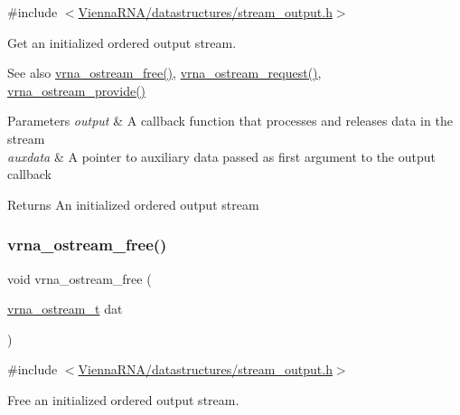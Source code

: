 {\ttfamily \#include $<$\hyperlink{datastructures_2stream__output_8h}{Vienna\+R\+N\+A/datastructures/stream\+\_\+output.\+h}$>$}



Get an initialized ordered output stream. 

\begin{DoxySeeAlso}{See also}
\hyperlink{group__buffer__utils_gaf813ec90e1446ba82c89f9a39688a3b3}{vrna\+\_\+ostream\+\_\+free()}, \hyperlink{group__buffer__utils_gaebca91932705d71bcbf00bd8d82bd7c8}{vrna\+\_\+ostream\+\_\+request()}, \hyperlink{group__buffer__utils_ga6253c42abdeaf3b41a38204865e1f0f7}{vrna\+\_\+ostream\+\_\+provide()}
\end{DoxySeeAlso}

\begin{DoxyParams}{Parameters}
{\em output} & A callback function that processes and releases data in the stream \\
\hline
{\em auxdata} & A pointer to auxiliary data passed as first argument to the {\ttfamily output} callback \\
\hline
\end{DoxyParams}
\begin{DoxyReturn}{Returns}
An initialized ordered output stream 
\end{DoxyReturn}
\mbox{\label{group__buffer__utils_gaf813ec90e1446ba82c89f9a39688a3b3}} 
\subsubsection{\texorpdfstring{vrna\+\_\+ostream\+\_\+free()}{vrna\_ostream\_free()}}
{\footnotesize\ttfamily void vrna\+\_\+ostream\+\_\+free (\begin{DoxyParamCaption}\item[{\hyperlink{group__buffer__utils_ga8da189552af21ab6e4e88bdcc240870c}{vrna\+\_\+ostream\+\_\+t}}]{dat }\end{DoxyParamCaption})}



{\ttfamily \#include $<$\hyperlink{datastructures_2stream__output_8h}{Vienna\+R\+N\+A/datastructures/stream\+\_\+output.\+h}$>$}



Free an initialized ordered output stream. 


